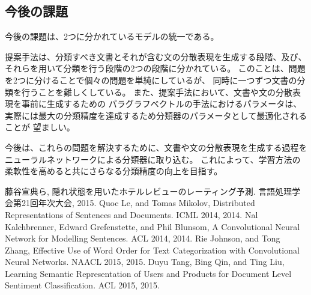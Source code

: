 \documentclass{ttithesis}
\begin{document}
\subsection{今後の課題}

今後の課題は、2つに分かれているモデルの統一である。

提案手法は、分類すべき文書とそれが含む文の分散表現を生成する段階、及び、
それらを用いて分類を行う段階の2つの段階に分かれている。
このことは、問題を2つに分けることで個々の問題を単純にしているが、
同時に一つずつ文書の分類を行うことを難しくしている。
また、提案手法において、文書や文の分散表現を事前に生成するための
パラグラフベクトルの手法におけるパラメータは、
実際には最大の分類精度を達成するため分類器のパラメータとして最適化されることが
望ましい。

今後は、これらの問題を解決するために、文書や文の分散表現を生成する過程を
ニューラルネットワークによる分類器に取り込む。
これによって、学習方法の柔軟性を高めると共にさらなる分類精度の向上を目指す。




\begin{thebibliography}{9}
  藤谷宣典ら,
  隠れ状態を用いたホテルレビューのレーティング予測.
  言語処理学会第21回年次大会, 2015.
  Quoc Le, and Tomas Mikolov,
  Distributed Representations of Sentences and Documents.
  ICML 2014, 2014.
  Nal Kalchbrenner, Edward Grefenstette, and Phil Blunsom,
  A Convolutional Neural Network for Modelling Sentences.
  ACL 2014, 2014.
  Rie Johnson, and Tong Zhang,
  Effective Use of Word Order for Text Categorization
  with Convolutional Neural Networks.
  NAACL 2015, 2015.
  Duyu Tang, Bing Qin, and Ting Liu,
  Learning Semantic Representation of Users and Products
  for Document Level Sentiment Classification.
  ACL 2015, 2015.
\end{thebibliography}
\end{document}
